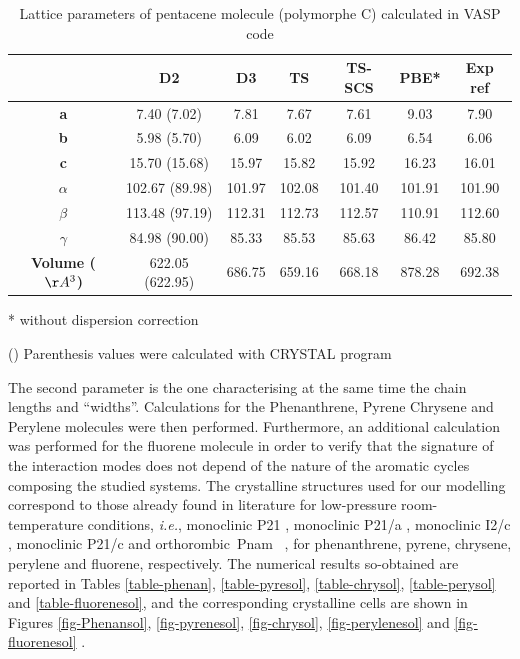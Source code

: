  	\begin{table}[H]
 		\caption{Lattice parameters of pentacene molecule (polymorphe C) calculated in VASP code} \label{table-pentaC}
 		\begin{center}
 			\begin{threeparttable}
 			\begin{tabular}{c c c c c c c}
 				\toprule
 				& \textbf{D2} & \textbf{D3} & \textbf{TS} & \textbf{TS-SCS} & \textbf{PBE*} & \textbf{Exp} ref\cite{campbell1961crystal} \\
 				\midrule
 				\textbf{a} &7.40 (7.02) & 7.81 & 7.67 & 7.61 & 9.03 & 7.90\\
 				\textbf{b}& 5.98 (5.70) & 6.09 & 6.02 & 6.09 & 6.54 & 6.06 \\
 				\textbf{c}& 15.70 (15.68) & 15.97 & 15.82 & 15.92 & 16.23 & 16.01 \\
 				\textbf{$\alpha$} & 102.67 (89.98) & 101.97 & 102.08 & 101.40 & 101.91 & 101.90\\
 				\textbf{$\beta$} & 113.48 (97.19) & 112.31 & 112.73 & 112.57 & 110.91 & 112.60\\
 				\textbf{$\gamma$} &84.98 (90.00) & 85.33 & 85.53 & 85.63 & 86.42 & 85.80\\
 				\textbf{Volume ($\AA^{3}$)} & 622.05 (622.95) & 686.75 & 659.16 & 668.18  & 878.28 & 692.38\\
 				\bottomrule
 			\end{tabular}
 			
 				\begin{tablenotes}
 					\item[*] without dispersion correction
 					\item[()] Parenthesis values were calculated with CRYSTAL program
 				\end{tablenotes}
 			\end{threeparttable}
 		\end{center}
 	\end{table}
 	
 	The second parameter is the one characterising at the same time the chain lengths and “widths”. Calculations for the Phenanthrene, Pyrene Chrysene and Perylene molecules were then performed. Furthermore, an additional calculation was performed for the fluorene molecule in order to verify that the signature of the interaction modes does not depend of the nature of the aromatic cycles composing the studied systems. The crystalline structures used for our modelling correspond to those already found in literature for low-pressure room-temperature conditions, \textit{i.e.}, monoclinic P21 \cite{fabbiani2006exploration}, monoclinic P21/a \cite{fabbiani2006exploration}, monoclinic I2/c \cite{burns1960refinement}, monoclinic P21/c \cite{nather1998solvent} and orthorombic Pnam  \cite{belsky1984fluorene}, for phenanthrene, pyrene, chrysene, perylene and fluorene, respectively. The numerical results so-obtained are reported in Tables \ref{table-phenan}, \ref{table-pyresol}, \ref{table-chrysol}, \ref{table-perysol} and \ref{table-fluorenesol}, and the corresponding crystalline cells are shown in Figures \ref{fig-Phenansol}, \ref{fig-pyrenesol}, \ref{fig-chrysol}, \ref{fig-perylenesol} and \ref{fig-fluorenesol} .
 	
